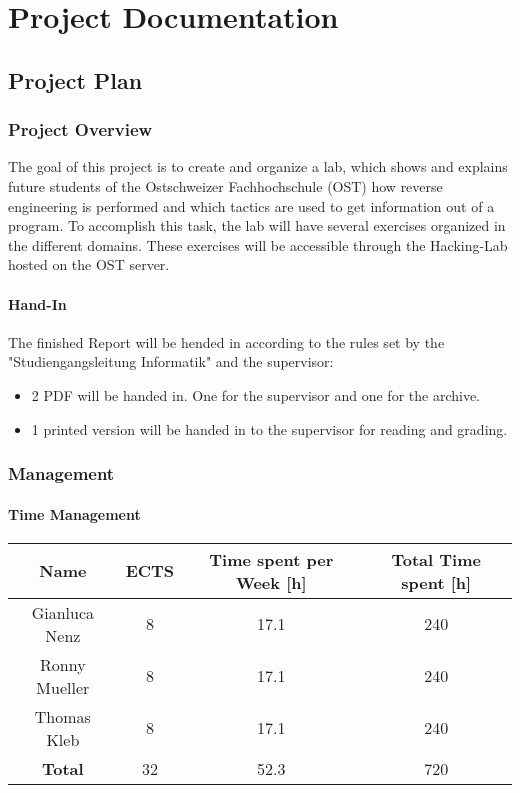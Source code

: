 \chapter{Project Documentation}
\section{Project Plan}
\subsection{Project Overview}
The goal of this project is to create and organize a lab, which shows and explains future students of the Ostschweizer Fachhochschule (OST) how reverse engineering is performed and which tactics are used to get information out of a program. To accomplish this task, the lab will have several exercises organized in the different domains. These exercises will be accessible through the Hacking-Lab hosted on the OST server. 

\subsubsection*{Hand-In}
The finished Report will be hended in according to the rules set by the "Studiengangsleitung Informatik" and the supervisor:
\begin{itemize}
    \item 2 PDF will be handed in. One for the supervisor and one for the archive.
    \item 1 printed version will be handed in to the supervisor for reading and grading.
\end{itemize}

\subsection{Management}
\subsubsection*{Time Management}

\begin{center}
    \begin{tabular}{||c c c c||} 
     \hline
      Name & ECTS & Time spent per Week [h] & Total Time spent [h]\\ [0.5ex] 
     \hline\hline
     Gianluca Nenz & 8 & 17.1 & 240 \\ 
     \hline
     Ronny Mueller & 8 & 17.1 & 240 \\
     \hline
     Thomas Kleb & 8 & 17.1 & 240 \\ 
     \hline
     \textbf{Total} & 32 & 52.3 & 720 \\[1ex] 
     \hline
    \end{tabular}
    \end{center}
